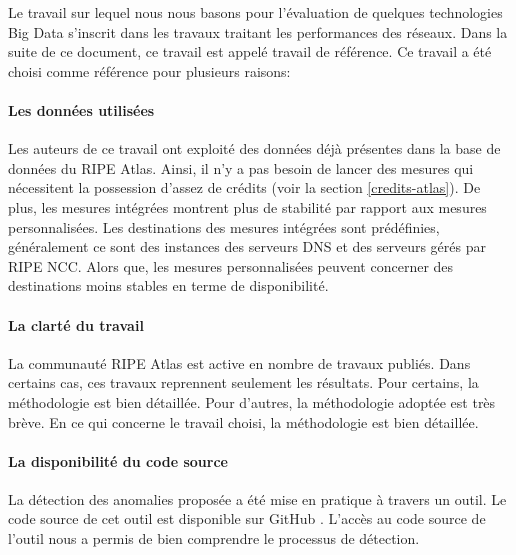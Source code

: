 Le travail sur lequel nous nous basons \cite{DBLP:journals/corr/FontugneAPB16} pour l'évaluation de quelques technologies Big Data s'inscrit dans les travaux traitant les performances des réseaux. Dans la suite de ce document, ce travail est appelé  travail de référence.  Ce travail a été choisi comme référence pour plusieurs raisons:


	
\paragraph{Les données utilisées}  Les auteurs de ce travail ont exploité des données déjà présentes dans la base de données du RIPE Atlas. Ainsi, il n'y a pas besoin de lancer des mesures qui nécessitent la possession d'assez de crédits (voir la section \ref{credits-atlas}). De plus, les mesures intégrées montrent plus de stabilité par rapport aux mesures personnalisées. Les destinations des mesures intégrées sont prédéfinies, généralement ce sont des instances des serveurs DNS et des serveurs gérés par  RIPE NCC. Alors que, les mesures personnalisées peuvent concerner des destinations moins stables en terme de disponibilité.
	
\paragraph{La clarté du travail} La communauté RIPE Atlas est active en nombre de travaux publiés. Dans certains cas, ces travaux reprennent seulement les résultats. Pour certains,  la méthodologie est bien détaillée. Pour d'autres, la méthodologie adoptée est très brève. En ce qui concerne le  travail choisi, la méthodologie est bien détaillée.
	
\paragraph{La disponibilité du code source} La détection des anomalies proposée a été mise en pratique à travers un outil. Le code source de cet outil est disponible sur GitHub \cite{InternetHealthReport}. L'accès au code source de l'outil nous a permis de bien comprendre le processus de détection.

	
